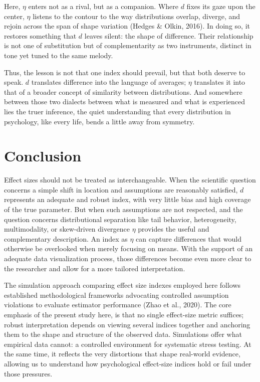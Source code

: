 \documentclass[
  12pt,
  a4paper,
  DIV=11,
  numbers=noendperiod]{scrartcl}
\begin{document}
Here, \(\eta\) enters not as a rival, but as a companion. Where \(d\)
fixes its gaze upon the center, \(\eta\) listens to the contour to the
way distributions overlap, diverge, and rejoin across the span of shape
variation (Hedges \& Olkin, 2016). In doing so, it restores something
that \(d\) leaves silent: the shape of difference. Their relationship is
not one of substitution but of complementarity as two instruments,
distinct in tone yet tuned to the same melody.

Thus, the lesson is not that one index should prevail, but that both
deserve to speak. \(d\) translates difference into the language of
averages; \(\eta\) translates it into that of a broader concept of
similarity between distributions. And somewhere between those two
dialects between what is measured and what is experienced lies the truer
inference, the quiet understanding that every distribution in
psychology, like every life, bends a little away from symmetry.

\section{Conclusion}\label{conclusion}

Effect sizes should not be treated as interchangeable. When the
scientific question concerns a simple shift in location and assumptions
are reasonably satisfied, \(d\) represents an adequate and robust index,
with very little bias and high coverage of the true parameter. But when
such assumptions are not respected, and the question concerns
distributional separation like tail behavior, heterogeneity,
multimodality, or skew-driven divergence \(\eta\) provides the useful
and complementary description. An index as \(\eta\) can capture
differences that would otherwise be overlooked when merely focusing on
means. With the support of an adequate data visualization process, those
differences become even more clear to the researcher and allow for a
more tailored interpretation.

The simulation approach comparing effect size indexes employed here
follows established methodological frameworks advocating controlled
assumption violations to evaluate estimator performance (Zhao et al.,
2020). The core emphasis of the present study here, is that no single
effect-size metric suffices; robust interpretation depends on viewing
several indices together and anchoring them to the shape and structure
of the observed data. Simulations offer what empirical data cannot: a
controlled environment for systematic stress testing. At the same time,
it reflects the very distortions that shape real-world evidence,
allowing us to understand how psychological effect-size indices hold or
fail under those pressures.
\end{document}
